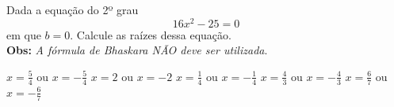 Dada a equação do 2º grau
\[16x^2-25=0\]
em que $b=0$. Calcule as raízes dessa equação.\\{\bf Obs: }{\it A fórmula de Bhaskara NÃO deve ser utilizada}.

$x=\frac{5}{4}$ ou $x=-\frac{5}{4}$
$x=2$ ou $x=-2$
$x=\frac{1}{4}$ ou $x=-\frac{1}{4}$
$x=\frac{4}{3}$ ou $x=-\frac{4}{3}$
$x=\frac{6}{7}$ ou $x=-\frac{6}{7}$



